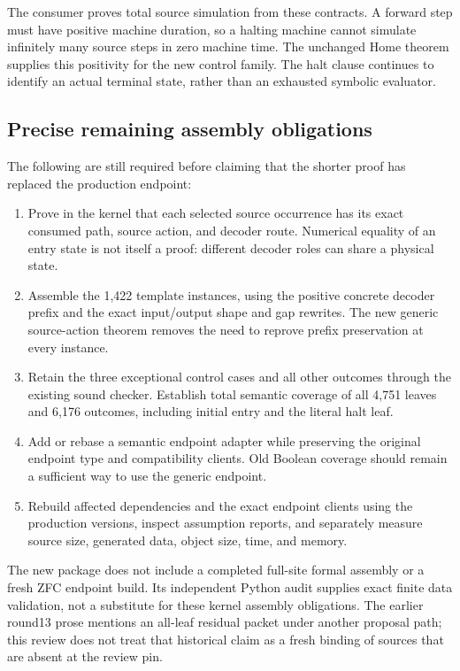 \documentclass[11pt,letterpaper]{article}
\theoremstyle{definition}
\newcommand{\code}[1]{\texttt{\detokenize{#1}}}
\begin{document}
The consumer proves total source simulation from these contracts. A forward
step must have positive machine duration, so a halting machine cannot
simulate infinitely many source steps in zero machine time. The unchanged
Home theorem supplies this positivity for the new control family. The halt
clause continues to identify an actual terminal state, rather than an
exhausted symbolic evaluator.

\subsection{Precise remaining assembly obligations}

The following are still required before claiming that the shorter proof has
replaced the production endpoint:

\begin{enumerate}
\item Prove in the kernel that each selected source occurrence has its exact
consumed path, source action, and decoder route. Numerical equality of an
entry state is not itself a \code{RoutedEntry} proof: different decoder roles
can share a physical state.
\item Assemble the 1,422 template instances, using the positive concrete
decoder prefix and the exact input/output shape and gap rewrites. The new
generic source-action theorem removes the need to reprove prefix preservation
at every instance.
\item Retain the three exceptional control cases and all other outcomes through
the existing sound checker. Establish total semantic coverage of all 4,751
leaves and 6,176 outcomes, including initial entry and the literal halt leaf.
\item Add or rebase a semantic endpoint adapter while preserving the original
endpoint type and compatibility clients. Old Boolean coverage should remain
a sufficient way to use the generic endpoint.
\item Rebuild affected dependencies and the exact endpoint clients using the
production versions, inspect assumption reports, and separately measure
source size, generated data, object size, time, and memory.
\end{enumerate}

The new package does not include a completed full-site formal assembly or a
fresh ZFC endpoint build. Its independent Python audit supplies exact finite
data validation, not a substitute for these kernel assembly obligations.
The earlier round13 prose mentions an all-leaf residual packet under another
proposal path; this review does not treat that historical claim as a fresh
binding of sources that are absent at the review pin.
\end{document}
